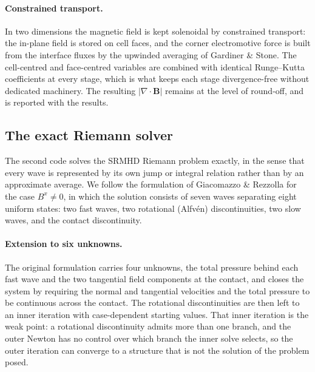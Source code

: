 \paragraph{Constrained transport.}
\label{sec:setup:ct}
In two dimensions the magnetic field is kept solenoidal by constrained
transport: the in-plane field is stored on cell faces, and the corner
electromotive force is built from the interface fluxes by the upwinded
averaging of Gardiner \& Stone. The cell-centred and face-centred variables
are combined with identical Runge--Kutta coefficients at every stage, which is
what keeps each stage divergence-free without dedicated machinery. The
resulting $\lvert\nabla\cdot\mathbf{B}\rvert$ remains at the level of
round-off, and is reported with the results.

\subsection{The exact Riemann solver}
\label{sec:setup:exact}

The second code solves the SRMHD Riemann problem exactly, in the sense that
every wave is represented by its own jump or integral relation rather than by
an approximate average. We follow the formulation of Giacomazzo \& Rezzolla
for the case $B^x \neq 0$, in which the solution consists of seven waves
separating eight uniform states: two fast waves, two rotational (Alfv\'en)
discontinuities, two slow waves, and the contact discontinuity.

\paragraph{Extension to six unknowns.}
The original formulation carries four unknowns, the total pressure behind each
fast wave and the two tangential field components at the contact, and closes
the system by requiring the normal and tangential velocities and the total
pressure to be continuous across the contact. The rotational discontinuities
are then left to an inner iteration with case-dependent starting values. That
inner iteration is the weak point: a rotational discontinuity admits more than
one branch, and the outer Newton has no control over which branch the inner
solve selects, so the outer iteration can converge to a structure that is not
the solution of the problem posed.

